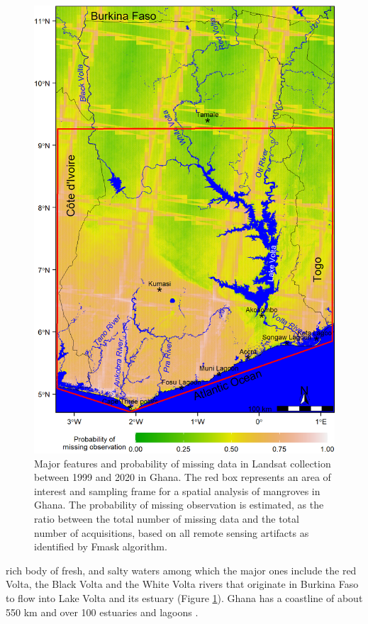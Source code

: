 \documentclass[12pt,oneside,preprint,3p,authoryear,times]{elsarticle} %
\begin{document}
\begin{figure}[!htbp]

{\centering \includegraphics[width=0.5\linewidth,]{figures/pngs/Ghana_study_area_map} 

}

\caption{Major features and probability of missing data in Landsat collection between 1999 and 2020 in Ghana. The red box represents an area of interest and sampling frame for a spatial analysis of mangroves in Ghana. The probability of missing observation is estimated, as the ratio between the total number of missing data and the total number of acquisitions, based on all remote sensing artifacts as identified by Fmask algorithm.}\label{fig:fig1}
\end{figure}

\noindent rich body of fresh, and salty waters among which the major
ones include the red Volta, the Black Volta and the White Volta rivers
that originate in Burkina Faso to flow into Lake Volta and its estuary
(Figure \ref{fig:fig1}). Ghana has a coastline of about 550 km and over
100 estuaries and lagoons \citep{Levy-et-al-2015}.
\end{document}
